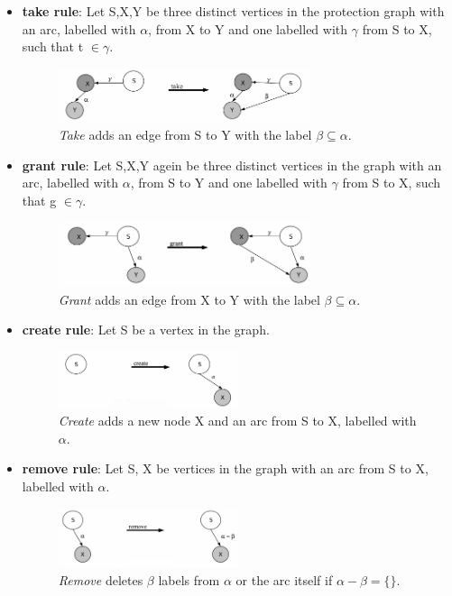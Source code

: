 \documentclass[pdftex,11pt,a4paper,twoside]{article}
\begin{document}
	\begin{itemize}
	\item \textbf{take rule}: Let S,X,Y be three distinct vertices in the protection graph with an arc, labelled with $\alpha$, from X to Y and one labelled with $\gamma$ from S to X, such that t $\in \gamma.$  
	\begin{figure}[ht]
	\centering
		\includegraphics[width=0.7\textwidth]{./Pictures/takeRule.png}
	\caption[take rule]{\textit{Take} adds an edge from S to Y with the label $\beta \subseteq \alpha$. \cite{TakeG}}
	\label{fig:cltake}
	\end{figure}		
	\item \textbf{grant rule}:	Let S,X,Y agein be three distinct vertices in the graph with an arc, labelled with  $\alpha$, from S to Y and one labelled with $\gamma$ from S to X, such that g $\in \gamma$. 
	\begin{figure}[ht]
	\centering
		\includegraphics[width=0.7\textwidth]{./Pictures/grantRule.png}
	\caption[grant rule]{\textit{Grant} adds an edge from X to Y with the label $\beta \subseteq \alpha$.  \cite{TakeG}}
	\label{fig:clgrant}
	\end{figure}		
	\item \textbf{create rule}: Let S be a vertex in the graph. 
	\begin{figure}[H]
	\centering
		\includegraphics[width=0.5\textwidth]{./Pictures/createRule.png}
	\caption[create rule]{\textit{Create} adds a new node X and an arc from S to X, labelled with $\alpha$. \cite{TakeG}}
	\label{fig:clcreate}
	\end{figure}	
	\item \textbf{remove rule}: Let S, X be vertices in the graph with an arc from S to X, labelled with $\alpha$. 
	\begin{figure}[ht]
	\centering
		\includegraphics[width=0.5\textwidth]{./Pictures/removeRule.png}
	\caption[remove rule]{\textit{Remove} deletes $\beta$ labels from $\alpha$ or the arc itself if $\alpha - \beta = \lbrace\rbrace$. \cite{TakeG}}
	\label{fig:clremove}
	\end{figure}		
	\end{itemize}	
\end{document}
